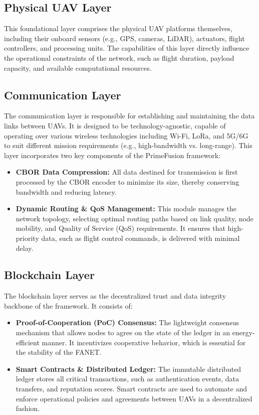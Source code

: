 \subsection{Physical UAV Layer}
This foundational layer comprises the physical UAV platforms themselves, including their onboard sensors (e.g., GPS, cameras, LiDAR), actuators, flight controllers, and processing units. The capabilities of this layer directly influence the operational constraints of the network, such as flight duration, payload capacity, and available computational resources.

\subsection{Communication Layer}
The communication layer is responsible for establishing and maintaining the data links between UAVs. It is designed to be technology-agnostic, capable of operating over various wireless technologies including Wi-Fi, LoRa, and 5G/6G to suit different mission requirements (e.g., high-bandwidth vs. long-range). This layer incorporates two key components of the PrimeFusion framework:
\begin{itemize}
    \item \textbf{CBOR Data Compression:} All data destined for transmission is first processed by the CBOR encoder to minimize its size, thereby conserving bandwidth and reducing latency.
    \item \textbf{Dynamic Routing & QoS Management:} This module manages the network topology, selecting optimal routing paths based on link quality, node mobility, and Quality of Service (QoS) requirements. It ensures that high-priority data, such as flight control commands, is delivered with minimal delay.
\end{itemize}

\subsection{Blockchain Layer}
The blockchain layer serves as the decentralized trust and data integrity backbone of the framework. It consists of:
\begin{itemize}
    \item \textbf{Proof-of-Cooperation (PoC) Consensus:} The lightweight consensus mechanism that allows nodes to agree on the state of the ledger in an energy-efficient manner. It incentivizes cooperative behavior, which is essential for the stability of the FANET.
    \item \textbf{Smart Contracts & Distributed Ledger:} The immutable distributed ledger stores all critical transactions, such as authentication events, data transfers, and reputation scores. Smart contracts are used to automate and enforce operational policies and agreements between UAVs in a decentralized fashion.
\end{itemize}

